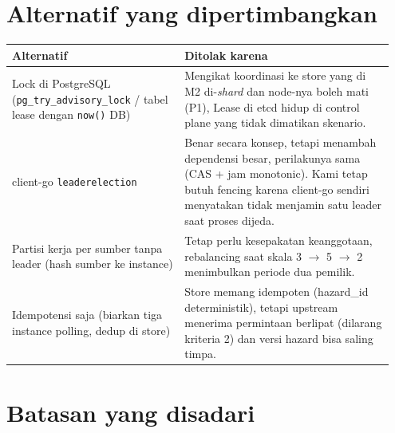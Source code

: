 \section{Alternatif yang dipertimbangkan}

{\small
\begin{longtable}{@{}>{\raggedright\arraybackslash}p{0.429\linewidth}>{\raggedright\arraybackslash}p{0.517\linewidth}@{}}
\toprule
\textbf{Alternatif} & \textbf{Ditolak karena} \\
\midrule
\endhead
Lock di PostgreSQL (\texttt{pg\_\allowbreak{}try\_\allowbreak{}advisory\_\allowbreak{}lock} / tabel lease dengan \texttt{now()} DB) & Mengikat koordinasi ke store yang di M2 di-\emph{shard} dan node-nya boleh mati (P1), Lease di etcd hidup di control plane yang tidak dimatikan skenario. \\
client-go \texttt{leaderelection} & Benar secara konsep, tetapi menambah dependensi besar, perilakunya sama (CAS + jam monotonic). Kami tetap butuh fencing karena client-go sendiri menyatakan tidak menjamin satu leader saat proses dijeda. \\
Partisi kerja per sumber tanpa leader (hash sumber ke instance) & Tetap perlu kesepakatan keanggotaan, rebalancing saat skala 3 $\rightarrow$ 5 $\rightarrow$ 2 menimbulkan periode dua pemilik. \\
Idempotensi saja (biarkan tiga instance polling, dedup di store) & Store memang idempoten (hazard\_id deterministik), tetapi upstream menerima permintaan berlipat (dilarang kriteria 2) dan versi hazard bisa saling timpa. \\
\bottomrule
\end{longtable}
}

\section{Batasan yang disadari}

